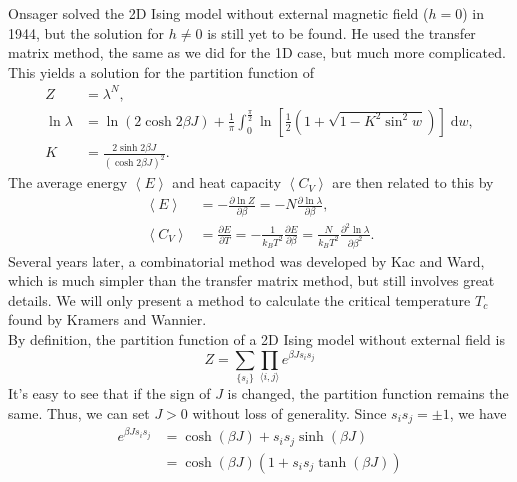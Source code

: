 \documentclass[11pt]{article}
\newcommand{\vd}{\mathrm{d}} %
\begin{document}
	Onsager solved the 2D Ising model without external magnetic field ($h = 0$) in 1944\cite{onsager_solution}, but the solution for $h \neq 0$ is still yet to be found. He used the transfer matrix method, the same as we did for the 1D case, but much more complicated. This yields a solution for the partition function of
	\begin{equation}
		\begin{split}
			Z &= \lambda^N,\\
			\ln{\lambda} &= \ln{\left(2 \cosh{2\beta J}\right)} + \frac{1}{\pi}\int_0^{\frac{\pi}{2}} \ln{\left[\frac{1}{2}\left(1 + \sqrt{1 - K^2\sin^2{w}}\right)\right]\;\vd w},\\
			K &= \frac{2\sinh{2\beta J}}{\left(\cosh{2\beta J}\right)^2}.
		\end{split}
	\end{equation}
	The average energy $\left<E\right>$ and heat capacity $\left<C_V\right>$ are then related to this by
	\begin{equation}
		\begin{split}
			\left<E\right> &= -\frac{\partial \ln{Z}}{\partial \beta} = -N\frac{\partial \ln{\lambda}}{\partial \beta}, \\
			\left<C_V\right> &= \frac{\partial E}{\partial T} = -\frac{1}{k_BT^2}\frac{\partial E}{\partial \beta} = \frac{N}{k_BT^2}\frac{\partial^2 \ln{\lambda}}{\partial \beta^2}.
		\end{split}
	\end{equation}
	Several years later, a combinatorial method was developed by Kac and Ward\cite{KacWard1952}, which is much simpler than the transfer matrix method, but still involves great details. We will only present a method to calculate the critical temperature $T_c$ found by Kramers and Wannier\cite{KramersWannier1941}. \\

	By definition, the partition function of a 2D Ising model without external field is
	\begin{equation} \label{eq:PartitionFunction2D}
		Z = \sum_{\{s_i\}} \prod_{\langle i,j \rangle} e^{\beta J s_i s_j}
	\end{equation}
	It's easy to see that if the sign of $J$ is changed, the partition function remains the same. Thus, we can set $J > 0$ without loss of generality. Since $s_i s_j = \pm 1$, we have
	\begin{equation} \label{eq:PartitionFunction2DTransformingTrick}
		\begin{aligned}
			e^{\beta J s_i s_j} &= \cosh(\beta J) + s_i s_j \sinh(\beta J) \\
			&= \cosh(\beta J)(1 + s_i s_j \tanh(\beta J))
		\end{aligned}
	\end{equation}
\end{document}

